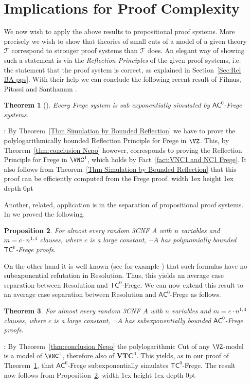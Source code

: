 \documentclass{LMCS}
\newtheorem{theorem}{Theorem}[section]
\newtheorem{proposition}[theorem]{Proposition}
\newenvironment{proof}{\QuadSpace\par\noindent{\bf
Proof}:}{\EndProof\HalfSpace} \fi
\newcommand{\QuadSpace}{}\newcommand{\HalfSpace}{}\newcommand{\FullSpace}{}\newcommand{\EndProof}{ \hfill \vrule width 1ex height 1ex depth 0pt }
\newenvironment{proof}{

\smallskip
\noindent\emph{Proof.}}{\hfill\(\Box\)
\bigskip
} \fi
\begin{document}
\section{Implications for Proof Complexity}\label{Sec:Impl Proof Cmpl}

We now wish to apply the above results to propositional proof systems. More precisely we wish to show that
theories of small cuts of a model of a given theory $\mathcal T$ correspond to stronger proof systems than
$\mathcal T$ does. An elegant way of showing such a statement is via the {\em Reflection Principles} of the
given proof systems, i.e. the statement that the proof system is correct, as explained in Section~\ref{Sec:Rel
BA pps}. With their help we can conclude the following recent result of Filmus, Pitassi and Santhanam
\cite{FPS11}.

\begin{theorem}[\cite{FPS11}]\label{thm FilPitSat}
  Every Frege system is sub exponentially simulated
  by $\mathsf{AC}^0$-Frege systems.
\end{theorem}

\begin{proof}
  By Theorem~\ref{Thm Simulation by Bounded Reflection} we have to prove the polylogarithmically bounded Reflection
  Principle for Frege in $\VZ$. This, by Theorem~\ref{thm:conclusion Nepo} however,
  corresponds to proving the Reflection Principle for Frege in $\VNC^1$, which holds by
  Fact~\ref{fact:VNC1 and NC1 Frege}. It also follows from Theorem~\ref{Thm Simulation by Bounded Reflection} that this proof can be efficiently computed from the Frege proof.
\end{proof}

Another, related, application is in the separation of propositional proof systems. In \cite{MT11} we proved the
following.
\begin{proposition}\label{Prop Iddo me}
  For almost every random 3CNF $A$ with $n$ variables and $m=c\cdot n^{1,4}$ clauses, where $c$ is a large
  constant, $\neg A$ has polynomially bounded $\mathsf{TC}^0$-Frege proofs.
\end{proposition}
On the other hand it is well known (see for example \cite{CS88}) that such formulas have no subexponential
refutation in Resolution. Thus, this yields an average case separation between Resolution and
$\mathsf{TC}^0$-Frege. We can now extend this result to an average case separation between Resolution and
$\mathsf{AC}^0$-Frege as follows.
\begin{theorem}
  For almost every random 3CNF $A$ with $n$ variables and $m=c\cdot n^{1,4}$ clauses, where $c$ is a large
  constant, $\neg A$ has subexponentially bounded $\mathsf{AC}^0$-Frege proofs.
\end{theorem}
\begin{proof}
  By Theorem~\ref{thm:conclusion Nepo} the polylogarithmic Cut of any $\VZ$-model is a model of $\VNC^1$,
  therefore also of $\mathbf{VTC}^0$. This yields, as in our proof of Theorem~\ref{thm FilPitSat}, that
  $\mathsf{AC}^0$-Frege subexponentially simulates $\mathsf{TC}^0$-Frege. The result now follows from
  Proposition~\ref{Prop Iddo me}.
\end{proof}
\end{document}
